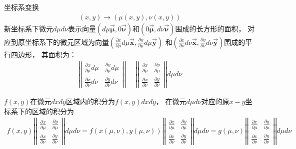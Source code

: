 坐标系变换
\begin{gather}
    (x,y)\rightarrow (\mu(x,y),\nu(x,y))
\end{gather}
新坐标系下微元$d\mu d\nu$表示向量$(d\mu \bm{\overrightarrow{\mu}},0\bm{\overrightarrow{\nu}})$和$(0\bm{\overrightarrow{\mu}},d\nu \bm{\overrightarrow{\nu}})$围成的长方形的面积，
对应到原坐标系下的微元区域为向量$(\frac{\partial x}{\partial \mu}d\mu\bm{\overrightarrow{x}},\frac{\partial y}{\partial \mu}d\mu\bm{\overrightarrow{y}})$
和$(\frac{\partial x}{\partial \nu}d\nu\bm{\overrightarrow{x}},\frac{\partial y}{\partial \nu}d\nu\bm{\overrightarrow{y}})$围成的平行四边形，
其面积为：
\begin{gather}
    \left | \left |
    \begin{matrix}
        \frac{\partial x}{\partial \mu}d\mu & \frac{\partial y}{\partial \mu}d\mu\\
        \frac{\partial x}{\partial \nu}d\nu & \frac{\partial y}{\partial \nu}d\nu
    \end{matrix}
    \right | \right |
    =\left | \left |
    \begin{matrix}
        \frac{\partial x}{\partial \mu} & \frac{\partial y}{\partial \mu}\\
        \frac{\partial x}{\partial \nu} & \frac{\partial y}{\partial \nu}
    \end{matrix}
    \right | \right | d\mu d\nu
\end{gather}

$f(x,y)$在微元$dxdy$区域内的积分为$f(x,y)dxdy$，
在微元$d\mu d\nu$对应的原$x-y$坐标系下的区域的积分为
\begin{gather}
    f(x,y)
    \left | \left |
    \begin{matrix}
        \frac{\partial x}{\partial \mu} & \frac{\partial y}{\partial \mu}\\
        \frac{\partial x}{\partial \nu} & \frac{\partial y}{\partial \nu}
    \end{matrix}
    \right | \right | d\mu d\nu
    =f(x(\mu,\nu),y(\mu,\nu))
    \left | \left |
    \begin{matrix}
        \frac{\partial x}{\partial \mu} & \frac{\partial y}{\partial \mu}\\
        \frac{\partial x}{\partial \nu} & \frac{\partial y}{\partial \nu}
    \end{matrix}
    \right | \right | d\mu d\nu
    =g(\mu,\nu)
    \left | \left |
    \begin{matrix}
        \frac{\partial x}{\partial \mu} & \frac{\partial y}{\partial \mu}\\
        \frac{\partial x}{\partial \nu} & \frac{\partial y}{\partial \nu}
    \end{matrix}
    \right | \right | d\mu d\nu
\end{gather}
